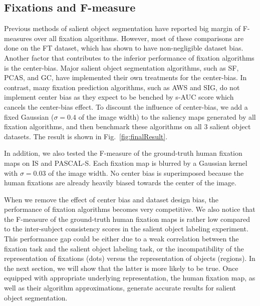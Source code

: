 \subsection{Fixations and F-measure}
Previous methods of salient object segmentation have reported big margin of F-measures over all fixation algorithms.  However, most of these comparisons are done on the FT dataset, which has shown to have non-negligible dataset bias.  Another factor that contributes to the inferior performance of fixation algorithms is the center-bias.  Major salient object segmentation algorithms, such as SF, PCAS, and GC, have implemented their own treatments for the center-bias.  In contrast, many fixation prediction algorithms, such as AWS and SIG, do not implement center bias as they expect to be benched by s-AUC score which cancels the center-bias effect.  To discount the influence of center-bias, we add a fixed Gaussian ($\sigma = 0.4$ of the image width) to the saliency maps generated by all fixation algorithms, and then benchmark these algorithms on all 3 salient object datasets.  The result is shown in Fig.~\ref{fig:finalResult}.

In addition, we also tested the F-measure of the ground-truth human fixation maps on IS and PASCAL-S.  Each fixation map is blurred by a Gaussian kernel with $\sigma = 0.03$ of the image width.  No center bias is superimposed because the human fixations are already heavily biased towards the center of the image.

When we remove the effect of center bias and dataset design bias, the performance of fixation algorithms becomes very competitive.  We also notice that the F-measure of the ground-truth human fixation maps is rather low compared to the inter-subject consistency scores in the salient object labeling experiment. This performance gap could be either due to a weak correlation between the fixation task and the salient object labeling task, or the incompatibility of the representation of fixations (dots) versus the representation of objects (regions).  In the next section, we will show that the latter is more likely to be true.  Once equipped with appropriate underlying representation, the human fixation map, as well as their algorithm approximations, generate accurate results for salient object segmentation.
